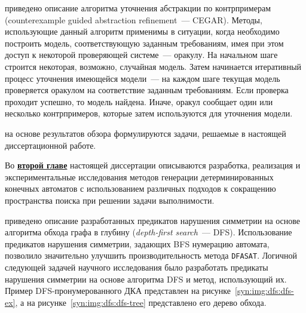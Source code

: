\insection{\ref{sec:review:cegar}} приведено описание алгоритма уточнения абстракции по контрпримерам (counterexample guided abstraction refinement~{---} CEGAR). 
Методы, использующие данный алгоритм применимы в ситуации, когда необходимо построить модель, соответствующую заданным требованиям, имея при этом доступ к некоторой проверяющей системе~--- оракулу. 
На начальном шаге строится некоторая, возможно, случайная модель.
Затем начинается итеративный процесс уточнения имеющейся модели~--- на каждом шаге текущая модель проверяется оракулом на соответствие заданным требованиям. 
Если проверка проходит успешно, то модель найдена.
Иначе, оракул сообщает один или несколько контрпримеров, которые затем используются для уточнения модели.

\insection{\ref{sec:review:tasks}} на основе результатов обзора формулируются задачи, решаемые в настоящей диссертационной работе.


Во \textbf{\underline{второй главе}} настоящей диссертации описываются разработка, реализация и экспериментальные исследования методов генерации детерминированных конечных автоматов с использованием различных подходов к сокращению пространства поиска при решении задачи выполнимости.

\insection{\ref{sec:space:dfs}} приведено описание разработанных предикатов нарушения симметрии на основе алгоритма обхода графа в глубину (\emph{depth-first search}~--- DFS). 
Использование предикатов нарушения симметрии, задающих BFS нумерацию автомата, позволило значительно улучшить производительность метода \texttt{DFASAT}.
Логичной следующей задачей научного исследования было разработать предикаты нарушения симметрии на основе алгоритма DFS и метод, использующий их.
Пример DFS-пронумерованного ДКА представлен на рисунке~\ref{syn:img:dfs:dfs-ex}, а на рисунке~\ref{syn:img:dfs:dfs-tree} представлено его дерево обхода.

